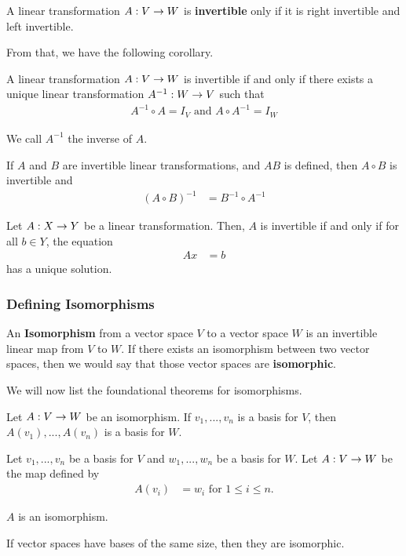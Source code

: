 \begin{definition}
    A linear transformation $A : V \rightarrow W$ is \textbf{invertible} only if it is right invertible and left invertible.
\end{definition}

From that, we have the following corollary.
\begin{corollary}
    A linear transformation $A : V \rightarrow W$ is invertible if and only if there exists a unique linear transformation $A^{-1}: W \rightarrow V$ such that
    \begin{align*}
        A^{-1} \circ A = I_V \text{ and } A \circ A^{-1} = I_W
    \end{align*}

    We call $A^{-1}$ the inverse of $A$.
\end{corollary}

\begin{lemma}
    If $A$ and $B$ are invertible linear transformations, and $AB$ is defined, then $A \circ B$ is invertible and
    \begin{align*}
        (A \circ B)^{-1} &= B^{-1} \circ A^{-1}
    \end{align*}
\end{lemma}

\begin{thm}
    Let $A : X \rightarrow Y$ be a linear transformation. Then, $A$ is invertible if and only if for all $b \in Y$, the equation
    \begin{align*}
        Ax &= b
    \end{align*}
    has a unique solution.
\end{thm}

\subsubsection{Defining Isomorphisms}
\begin{definition}
    An \textbf{Isomorphism} from a vector space $V$ to a vector space $W$ is an invertible linear map from $V$ to $W$. If there exists an isomorphism
    between two vector spaces, then we would say that those vector spaces are \textbf{isomorphic}.
\end{definition}

We will now list the foundational theorems for isomorphisms.
\begin{thm}
Let $A : V \rightarrow W$ be an isomorphism. If $v_1, ..., v_n$ is a basis for $V$, then $A(v_1), ..., A(v_n)$ is a basis for $W$.
\end{thm}

\begin{thm}
    Let $v_1, ..., v_n$ be a basis for $V$ and $w_1, ..., w_n$ be a basis for $W$. Let $A : V \rightarrow W$ be the map defined by
    \begin{align*}
        A(v_i) &= w_i \text{ for } 1 \leq i \leq n.
    \end{align*}

    $A$ is an isomorphism.
\end{thm}

\begin{corollary}
    If vector spaces have bases of the same size, then they are isomorphic.
\end{corollary}